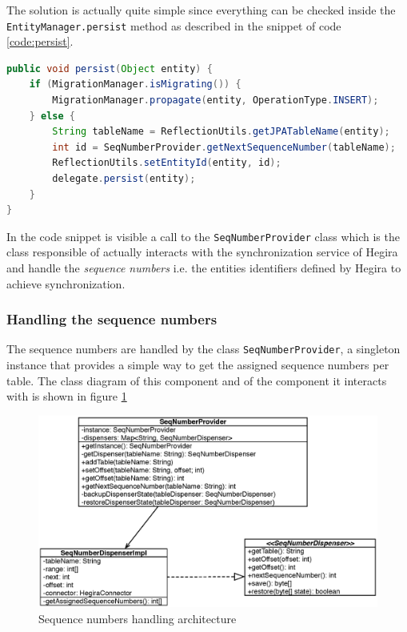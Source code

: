\noindent The solution is actually quite simple since everything can be checked inside the \texttt{EntityManager.persist} method as described in the snippet of code \ref{code:persist}.

\begin{lstlisting}[language=Java, caption=Persist operation, label=code:persist]
public void persist(Object entity) {
    if (MigrationManager.isMigrating()) {
        MigrationManager.propagate(entity, OperationType.INSERT);
    } else {
        String tableName = ReflectionUtils.getJPATableName(entity);
        int id = SeqNumberProvider.getNextSequenceNumber(tableName);
        ReflectionUtils.setEntityId(entity, id);
        delegate.persist(entity);
    }
}
\end{lstlisting}

\noindent In the code snippet is visible a call to the  \texttt{SeqNumberProvider} class which is the class responsible of actually interacts with the synchronization service of Hegira and handle the \textit{sequence numbers} i.e. the entities identifiers defined by Hegira to achieve synchronization. 

\subsubsection{Handling the sequence numbers}
The sequence numbers are handled by the class \texttt{SeqNumberProvider}, a singleton instance that provides a simple way to get the assigned sequence numbers per table.
\noindent The class diagram of this component and of the component it interacts with is shown in figure \ref{fig:seq-provider}

\begin{figure}[tbh]
  \centering
  \includegraphics[width=12cm]{images/seq_provider}
  \caption{Sequence numbers handling architecture}
  \label{fig:seq-provider}
\end{figure} 

